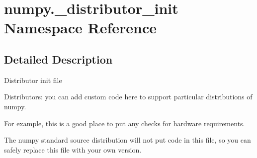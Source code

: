 \hypertarget{namespacenumpy_1_1__distributor__init}{}\section{numpy.\+\_\+distributor\+\_\+init Namespace Reference}
\label{namespacenumpy_1_1__distributor__init}


\subsection{Detailed Description}
\begin{DoxyVerb}Distributor init file

Distributors: you can add custom code here to support particular distributions
of numpy.

For example, this is a good place to put any checks for hardware requirements.

The numpy standard source distribution will not put code in this file, so you
can safely replace this file with your own version.
\end{DoxyVerb}
 